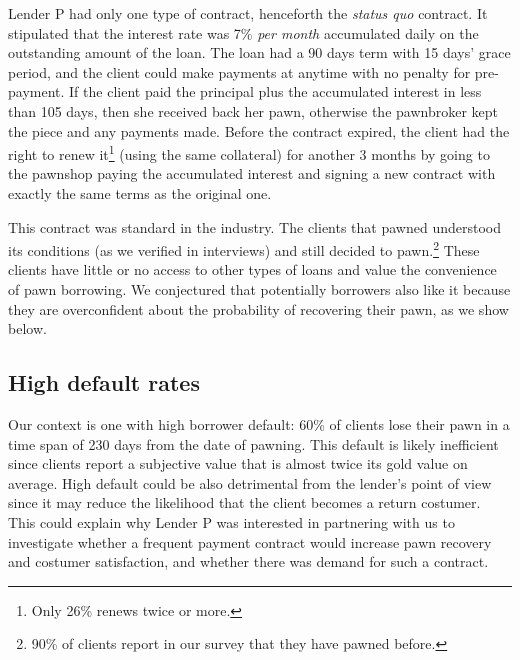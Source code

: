 \documentclass[oneside,11pt]{article}
\begin{document}
Lender P had only one type of contract, henceforth the \textit{status quo} contract. It stipulated that the interest rate was 7\% \textit{per month} accumulated daily on the outstanding amount of the loan. The loan had a 90 days term with 15 days' grace period, and the client could make payments at anytime with no penalty for pre-payment. If the client paid the principal plus the accumulated interest in less than 105 days, then she received back her pawn, otherwise the pawnbroker kept the piece and any payments made. Before the contract expired, the client had the right to renew it\footnote{Only 26\% renews twice or more. } (using the same collateral) for another 3 months by going to the pawnshop paying the accumulated interest and signing a new contract with exactly the same terms as the original one. %

This contract was standard in the industry. The clients that pawned understood its conditions (as we verified in interviews) and still decided to pawn.\footnote{90\% of clients report in our survey that they have pawned before.} These clients have little or no access to other types of loans and value the convenience of pawn borrowing. We conjectured that potentially borrowers also like it because they are overconfident about the probability of recovering their pawn, as we show below.

\subsection{High default rates}
Our context is one with high borrower default: 60\% of clients lose their pawn in a time span of 230 days from the date of pawning. This default is likely inefficient since clients report a subjective value that is almost twice its gold value on average. High default could be also detrimental from the lender's point of view since it may reduce the likelihood that the client becomes a return costumer. This could explain why Lender P was interested in  partnering with us to investigate whether a frequent payment contract would increase pawn recovery and costumer satisfaction, and whether there was demand for such a contract. 
\end{document}
